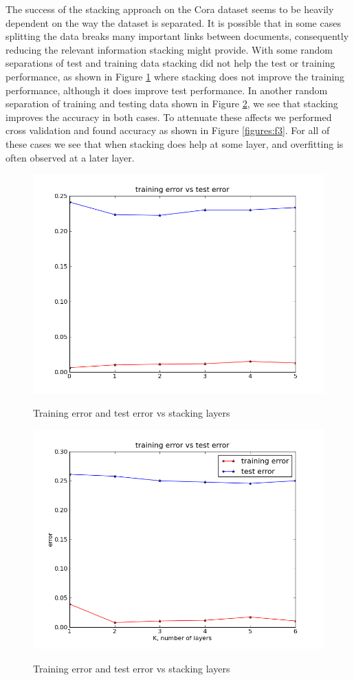 \documentclass[a4paper,11pt]{article}
\begin{document}
The success of the stacking approach on the Cora dataset seems to be heavily
dependent on the way the dataset is separated. It is possible that in some 
cases splitting the data breaks many important links between documents,
consequently reducing the relevant information stacking might provide. 
With some random separations of test and training data stacking did not help
the test or training performance, as shown in Figure \ref{figures:f1} where
stacking does not improve the training performance, although it does improve
test performance. In another random separation of training and testing data 
shown in Figure \ref{figures:f2}, we see that stacking improves the accuracy 
in both cases. To attenuate these affects we performed cross validation and 
found accuracy as shown in Figure \ref{figures:f3}. For all of these cases we 
see that when stacking does help at some layer, and overfitting is often observed at a later layer.

\begin{figure}[!ht]
  \caption{Training error and test error vs stacking layers}
  \centering
  \includegraphics[width=4.5in]{WU5/trainingvstestD3R.png}
  \label{figures:f1}
\end{figure}

\newpage

\begin{figure}[!ht]
  \caption{Training error and test error vs stacking layers}
  \centering
  \includegraphics[width=4.5in]{WU5/trainingvstestD2R.png}
  \label{figures:f2}
\end{figure}
\end{document}
